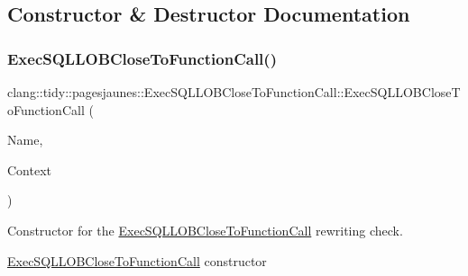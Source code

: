 \subsection{Constructor \& Destructor Documentation}
\mbox{\label{classclang_1_1tidy_1_1pagesjaunes_1_1_exec_s_q_l_l_o_b_close_to_function_call_a107a219b92860af88d0f49b04401e5a9}} 
\subsubsection{\texorpdfstring{Exec\+S\+Q\+L\+L\+O\+B\+Close\+To\+Function\+Call()}{ExecSQLLOBCloseToFunctionCall()}}
{\footnotesize\ttfamily clang\+::tidy\+::pagesjaunes\+::\+Exec\+S\+Q\+L\+L\+O\+B\+Close\+To\+Function\+Call\+::\+Exec\+S\+Q\+L\+L\+O\+B\+Close\+To\+Function\+Call (\begin{DoxyParamCaption}\item[{String\+Ref}]{Name,  }\item[{Clang\+Tidy\+Context $\ast$}]{Context }\end{DoxyParamCaption})}



Constructor for the \hyperlink{classclang_1_1tidy_1_1pagesjaunes_1_1_exec_s_q_l_l_o_b_close_to_function_call}{Exec\+S\+Q\+L\+L\+O\+B\+Close\+To\+Function\+Call} rewriting check. 

\hyperlink{classclang_1_1tidy_1_1pagesjaunes_1_1_exec_s_q_l_l_o_b_close_to_function_call}{Exec\+S\+Q\+L\+L\+O\+B\+Close\+To\+Function\+Call} constructor

